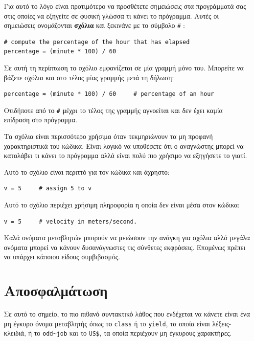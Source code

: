 \documentclass[10pt]{book}
\begin{document}
Για αυτό το λόγο είναι προτιμότερο να προσθέτετε σημειώσεις στα προγράμματά σας
στις οποίες να εξηγείτε σε φυσική γλώσσα τι κάνει το πρόγραμμα.  Αυτές οι σημειώσεις ονομάζονται {\bf σχόλια} και ξεκινάνε με το σύμβολο \verb"#" :

\begin{verbatim}
# compute the percentage of the hour that has elapsed
percentage = (minute * 100) / 60
\end{verbatim}
%

Σε αυτή τη περίπτωση το σχόλιο εμφανίζεται σε μία γραμμή μόνο του. Μπορείτε
να βάζετε σχόλια και στο τέλος μίας γραμμής μετά τη δήλωση:

\begin{verbatim}
percentage = (minute * 100) / 60     # percentage of an hour
\end{verbatim}
%

Οτιδήποτε από το  {\tt \#}  μέχρι το τέλος της γραμμής αγνοείται
και δεν έχει καμία επίδραση στο πρόγραμμα.

Τα σχόλια είναι περισσότερο χρήσιμα όταν τεκμηριώνουν τα μη προφανή χαρακτηριστικά
του κώδικα.  Είναι λογικό να υποθέσετε ότι ο αναγνώστης μπορεί να καταλάβει
τι κάνει το πρόγραμμα αλλά είναι πολύ πιο χρήσιμο να εξηγήσετε το γιατί.

Αυτό το σχόλιο είναι περιττό για τον κώδικα και άχρηστο:


\begin{verbatim}
v = 5     # assign 5 to v
\end{verbatim}
%

Αυτό το σχόλιο περιέχει χρήσιμη πληροφορία η οποία δεν είναι μέσα
στον κώδικα:


\begin{verbatim}
v = 5     # velocity in meters/second.
\end{verbatim}
%

Καλά ονόματα μεταβλητών μπορούν να μειώσουν την ανάγκη για σχόλια 
αλλά μεγάλα ονόματα μπορεί να κάνουν δυσανάγνωστες τις σύνθετες εκφράσεις.
Επομένως πρέπει να υπάρχει κάποιου είδους συμβιβασμός.


\section{Αποσφαλμάτωση}

Σε αυτό το σημείο, το πιο πιθανό συντακτικό λάθος που ενδέχεται να κάνετε
είναι ένα μη έγκυρο όνομα μεταβλητής όπως το {\tt class} ή το
{\tt yield}, τα οποία είναι λέξεις-κλειδιά, ή το \verb"odd~job"
και το \verb"US$", τα οποία περιέχουν μη έγκυρους χαρακτήρες.
\end{document}
